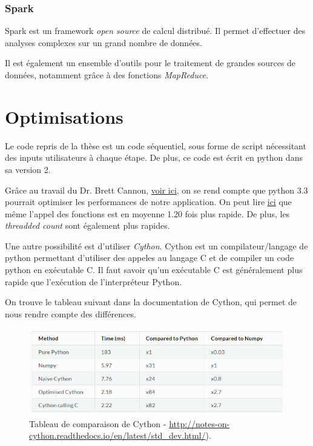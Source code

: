 \subsubsection{Spark}
Spark est un framework \emph{open source} de calcul distribué. Il permet d'effectuer des analyses complexes sur un grand nombre de données.

Il est également un ensemble d'outils pour le traitement de grandes sources de données, notamment grâce à des fonctions \emph{MapReduce}.
	
\section{Optimisations}
Le code repris de la thèse \thLeite est un code séquentiel, sous forme de script nécessitant des inputs utilisateurs à chaque étape. De plus, ce code est écrit en python dans sa version 2.

Grâce au travail du Dr. Brett Cannon, \href{https://speakerdeck.com/pyconslides/python-3-dot-3-trust-me-its-better-than-python-2-dot-7-by-dr-brett-cannon}{voir ici}, on se rend compte que python 3.3 pourrait optimiser les performances de notre application. On peut lire  \href{https://mail.python.org/pipermail/python-dev/2012-October/121923.html}{ici} que même l'appel des fonctions est en moyenne 1.20 fois plus rapide. De plus, les \emph{threadded count} sont également plus rapides.

Une autre possibilité est d'utiliser \emph{Cython}. Cython est un compilateur/langage de python permettant d'utiliser des appeles au langage C et de compiler un code python en exécutable C. Il faut savoir qu'un exécutable C est généralement plus rapide que l'exécution de l'interpréteur Python. 

On trouve le tableau suivant dans la documentation de Cython, qui permet de nous rendre compte des différences.

\begin{figure}[H] 
\centering 
\includegraphics[width=1\columnwidth]{img/table_cython} 
\caption[Tableau performences Cython]{Tableau de comparaison de Cython - \url{http://notes-on-cython.readthedocs.io/en/latest/std_dev.html/}).}
\label{fig:galleria} 
\end{figure}

